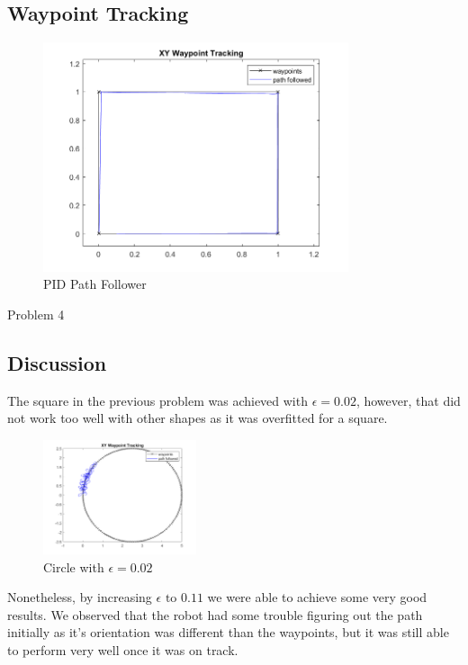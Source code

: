 \documentclass[answers]{exam}
\begin{document}
\begin{questions}
    \subsection*{Waypoint Tracking}
    \begin{figure}[H]
        \centering
        \includegraphics[width=0.8\textwidth]{images/3-square.png}
        \caption{PID Path Follower}
        \label{fig:my_label}
    \end{figure}

    \question Problem 4
    \subsection*{Discussion}
    The square in the previous problem was achieved with $\epsilon = 0.02$,
    however, that did not work too well with other shapes as it was overfitted for
    a square.
    \begin{figure}[H]
        \centering
        \includegraphics[width=0.4\textwidth]{images/4-circle-e.png}
        \caption{Circle with $\epsilon=0.02$}
        \label{fig:enter-label}
    \end{figure}

    Nonetheless, by increasing $\epsilon \text{ to } 0.11$ we were able to achieve
    some very good results. We observed that the robot had some trouble figuring
    out the path initially as it's orientation was different than the waypoints,
    but it was still able to perform very well once it was on track.

\end{questions}
\end{document}
